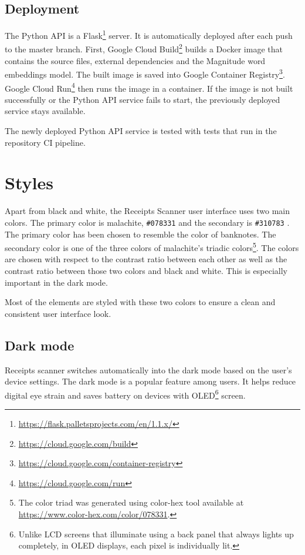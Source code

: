 \documentclass[
  digital, %
  table,   %
  oneside, %
  lof,     %
  lot,     %
]{fithesis3}
\makeatletter
\def\testclr#1#{\@testclr{#1}}
\def\@testclr#1#2{{\fboxsep\z@\fbox{\colorbox#1{#2}{\phantom{XX}}}}}
\makeatother
\begin{document}
\subsection{Deployment}
The Python API is a Flask\footnote{\url{https://flask.palletsprojects.com/en/1.1.x/}} server. 
It is automatically deployed after each push to the master branch.
First, Google Cloud Build\footnote{\url{https://cloud.google.com/build}} builds a Docker image that contains the source files, external dependencies and the Magnitude word embeddings model. The built image is saved into Google Container Registry\footnote{\url{https://cloud.google.com/container-registry}}. Google Cloud Run\footnote{\url{https://cloud.google.com/run}} then runs the image in a container.
If the image is not built successfully or the Python API service fails to start, the previously deployed service stays available.

The newly deployed Python API service is tested with tests that run in the repository CI pipeline.

\section{Styles}
Apart from black and white, the Receipts Scanner user interface uses two main colors. The primary color is malachite, \texttt{\#078331}  and the secondary is \texttt{\#310783} . The primary color has been chosen to resemble the color of banknotes. The secondary color is one of the three colors of malachite's triadic colors\footnote{The color triad was generated using color-hex tool available at \url{https://www.color-hex.com/color/078331}.}. 
The colors are chosen with respect to the contrast ratio between each other as well as the contrast ratio between those two colors and black and white. This is especially important in the dark mode.

Most of the elements are styled with these two colors to ensure a clean and consistent user interface look.

\subsection{Dark mode}
Receipts scanner switches automatically into the dark mode based on the user's device settings. The dark mode is a popular feature among users. It helps reduce digital eye strain and saves battery on devices with OLED\footnote{Unlike LCD screens that illuminate using a back panel that always lights up completely, in OLED displays, each pixel is individually lit.} screen.
\end{document}

